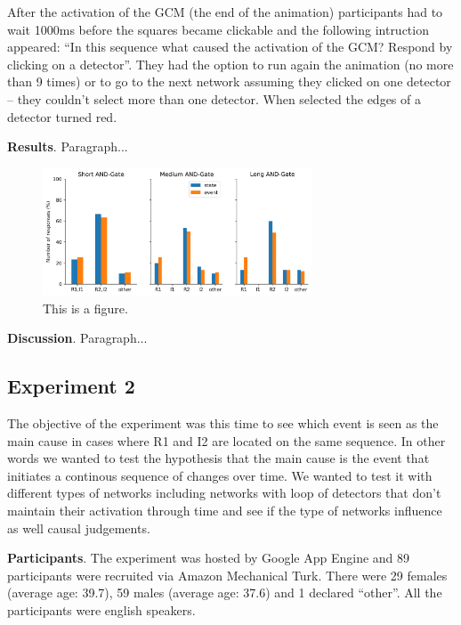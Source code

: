 \documentclass[10pt,letterpaper]{article}
\begin{document}
After the activation of the GCM (the end of the animation) participants had to wait 1000ms before the squares became clickable and the following intruction appeared: ``In this sequence what caused the activation of the GCM? Respond by clicking on a detector''. They had the option to run again the animation (no more than 9 times) or to go to the next network assuming they clicked on one detector -- they couldn't select more than one detector. When selected the edges of a detector turned red.

\textbf{Results}. Paragraph...

\begin{figure}[ht]
\begin{center}
\includegraphics[width=8cm]{results_E1}
\end{center}
\caption{This is a figure.} 
\label{fig:2}
\end{figure}

\textbf{Discussion}. Paragraph...

\subsection{Experiment 2}

The objective of the experiment was this time to see which event is seen as the main cause in cases where R1 and I2 are located on the same sequence. In other words we wanted to test the hypothesis that the main cause is the event that initiates a continous sequence of changes over time. We wanted to test it with different types of networks including networks with loop of detectors that don't maintain their activation through time and see if the type of networks influence as well causal judgements.

\textbf{Participants}. The experiment was hosted by Google App Engine and 89 participants were recruited via Amazon Mechanical Turk. There were 29 females (average age: 39.7), 59 males (average age: 37.6) and 1 declared ``other''. All the participants were english speakers.
\end{document}
